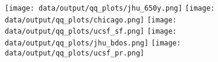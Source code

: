 \documentclass[a4paper]{article}
\begin{document}
\begin{figure}
\texttt{[image: data/output/qq\_plots/jhu\_650y.png]}
\texttt{[image: data/output/qq\_plots/chicago.png]}
\texttt{[image: data/output/qq\_plots/ucsf\_sf.png]}
\texttt{[image: data/output/qq\_plots/jhu\_bdos.png]}
\texttt{[image: data/output/qq\_plots/ucsf\_pr.png]}
\end{figure}
\end{document}
